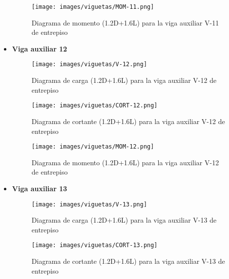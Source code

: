 \begin{itemize}
            \begin{figure}[H]
                \centering
                \texttt{[image: images/viguetas/MOM-11.png]}
                \caption{Diagrama de momento (1.2D+1.6L) para la viga auxiliar V-11 de entrepiso}
                \label{fig:Mom V-11 EP}
            \end{figure}
            
            \item \textbf{Viga auxiliar 12}\\
            \begin{figure}[H]
                \centering
                \texttt{[image: images/viguetas/V-12.png]}
                \caption{Diagrama de carga (1.2D+1.6L) para la viga auxiliar V-12 de entrepiso}
                \label{fig:W V-12 EP}
            \end{figure}
            
            \begin{figure}[H]
                \centering
                \texttt{[image: images/viguetas/CORT-12.png]}
                \caption{Diagrama de cortante (1.2D+1.6L) para la viga auxiliar V-12 de entrepiso}
                \label{fig:Cort V-12 EP}
            \end{figure}
            
            \begin{figure}[H]
                \centering
                \texttt{[image: images/viguetas/MOM-12.png]}
                \caption{Diagrama de momento (1.2D+1.6L) para la viga auxiliar V-12 de entrepiso}
                \label{fig:Mom V-12 EP}
            \end{figure}
            
            
            \item \textbf{Viga auxiliar 13}\\
            \begin{figure}[H]
                \centering
                \texttt{[image: images/viguetas/V-13.png]}
                \caption{Diagrama de carga (1.2D+1.6L) para la viga auxiliar V-13 de entrepiso}
                \label{fig:W V-13 EP}
            \end{figure}
            
            \begin{figure}[H]
                \centering
                \texttt{[image: images/viguetas/CORT-13.png]}
                \caption{Diagrama de cortante (1.2D+1.6L) para la viga auxiliar V-13 de entrepiso}
                \label{fig:Cort V-13 EP}
            \end{figure}
            

\end{itemize}

